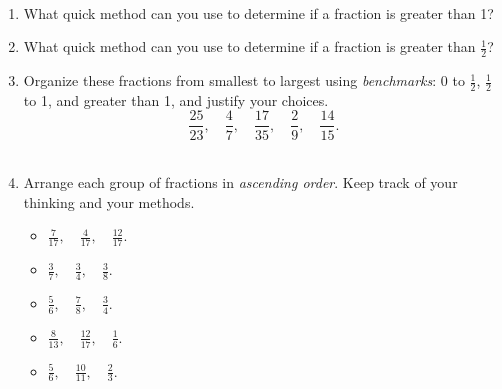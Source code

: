 

\begin{thinkpair*}\ 
\begin{enumerate}
\item
What quick method can you use to determine if a fraction is greater than 1?\\

\item
What quick method can you use to determine if a fraction is greater than $\displaystyle \frac 1 2$?\\

\item
Organize these fractions from smallest to largest using \emph{benchmarks}: 0 to $\frac 1 2$, $\frac 1 2$ to 1, and greater than 1, and justify your choices.
\[
\frac{25}{23},\quad  \frac{4}{7}, \quad \frac{17}{35}, \quad \frac{2}{9},  \quad \frac{14}{15}.
\]\\

\item
Arrange each group of fractions in \emph{ascending order}.  Keep track of your thinking and your methods.

\begin{itemize}
\item
$\displaystyle
\frac{7}{17},\quad  \frac{4}{17}, \quad \frac{12}{17}.
$\\

\item
$\displaystyle
\frac{3}{7},\quad  \frac{3}{4}, \quad \frac{3}{8}.
$\\

\item
$\displaystyle
\frac{5}{6},\quad  \frac{7}{8}, \quad \frac{3}{4}.
$\\

\item
$\displaystyle
\frac{8}{13},\quad  \frac{12}{17}, \quad \frac{1}{6}.
$\\


\item
$\displaystyle
\frac{5}{6},\quad  \frac{10}{11}, \quad \frac{2}{3}.
$\\

\end{itemize}

\end{enumerate}



\end{thinkpair*}


